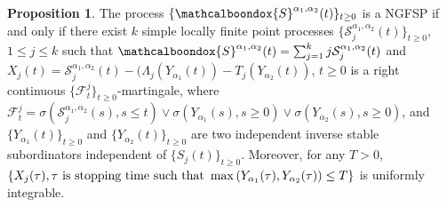 \documentclass[11pt,oneside,reqno]{amsart}
\theoremstyle{definition}
\newtheorem{proposition}{Proposition}[section]
\theoremstyle{remarkstyle}
\begin{document}
\begin{proposition}\label{Watanabe_characterization_NGFSP}
The process $\{\mathcalboondox{S}^{\alpha_1,\alpha_2}(t)\}_{t\ge 0}$ is a NGFSP if and only if there exist $k$ simple locally finite point processes $\{\mathcal{S}^{\alpha_1,\alpha_2}_{j}(t)\}_{t\ge 0}$, $1\le j\le k$ such that $\mathcalboondox{S}^{\alpha_1,\alpha_2}(t)=\sum_{j=1}^{k}j\mathcal{S}^{\alpha_1,\alpha_2}_{j}(t)$ and $X_j(t)=\mathcal{S}^{\alpha_1,\alpha_2}_{j}(t)-(\Lambda_j(Y_{\alpha_1}(t))-T_j(Y_{\alpha_2}(t))$, $t\ge 0$ is a right continuous $\{\mathcal{F}_t^j\}_{t\ge 0}$-martingale, where $\mathcal{F}_t^j=\sigma\left(\mathcal{S}_j^{\alpha_1,\alpha_2}(s),s\le t\right)\vee\sigma\left(Y_{\alpha_1}(s),s\ge 0\right)\vee\sigma\left(Y_{\alpha_2}(s),s\ge 0\right)$, and $\{Y_{\alpha_1}(t)\}_{t\ge 0}$ and $\{Y_{\alpha_2}(t)\}_{t\ge 0}$ are two independent inverse stable subordinators independent of $\{S_j(t)\}_{t\ge 0}$. Moreover, for any $T>0$, $\{X_j(\tau),\tau\,\, \text{is stopping time such that}\\\,\,\max\left(Y_{\alpha_1}(\tau),Y_{\alpha_2}(\tau)\right)\le T\}$ is uniformly integrable.
\end{proposition}
\end{document}
